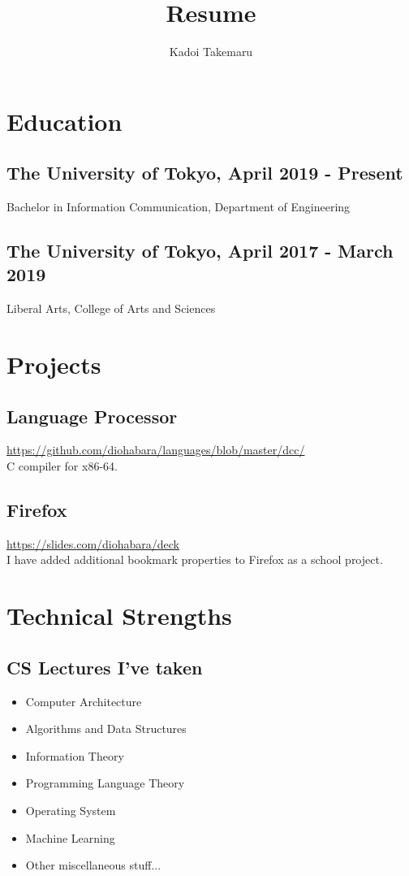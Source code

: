 \documentclass{article}
\title{Resume}
\author{Kadoi Takemaru}
\begin{document}
\maketitle

\section*{Education}
    \subsection*{The University of Tokyo, April 2019 - Present}
        Bachelor in Information Communication, Department of Engineering
    \subsection*{The University of Tokyo, April 2017 - March 2019}
        Liberal Arts, College of Arts and Sciences

\section*{Projects}
    \subsection*{Language Processor}
        \url{https://github.com/diohabara/languages/blob/master/dcc/}
        \\ C compiler for x86-64.

    \subsection*{Firefox}
        \url{https://slides.com/diohabara/deck}
        \\ I have added additional bookmark properties to Firefox as a school project.

\section*{Technical Strengths}
    \subsection*{CS Lectures I've taken}
        \begin{itemize}
            \item Computer Architecture
            \item Algorithms and Data Structures
            \item Information Theory
            \item Programming Language Theory
            \item Operating System
            \item Machine Learning
            \item Other miscellaneous stuff...
        \end{itemize}
\end{document}

